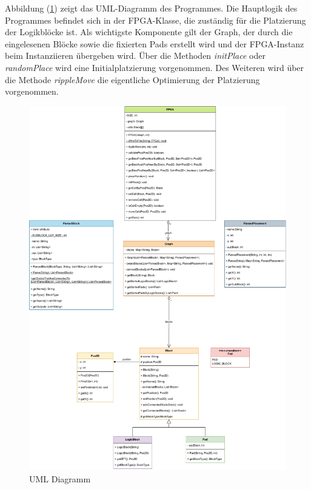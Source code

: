         Abbildung (\ref{fig:uml}) zeigt das UML-Diagramm des Programmes.
        Die Hauptlogik des Programmes befindet sich in der FPGA-Klasse,
        die zuständig für die Platzierung der Logikblöcke ist.
        Als wichtigste Komponente gilt der Graph, der durch die eingelesenen Blöcke sowie die
        fixierten Pads erstellt wird und der FPGA-Instanz beim Instanziieren übergeben wird.
        Über die Methoden \textit{initPlace} oder \textit{randomPlace} wird eine Initialplatzierung vorgenommen.
        Des Weiteren wird über die Methode \textit{rippleMove} die eigentliche Optimierung der Platzierung
        vorgenommen.
        \begin{figure}[H]
            \centering
            \includegraphics[width=\textwidth]{img/UML.pdf}
            \caption{UML Diagramm}
            \label{fig:uml}
        \end{figure}

